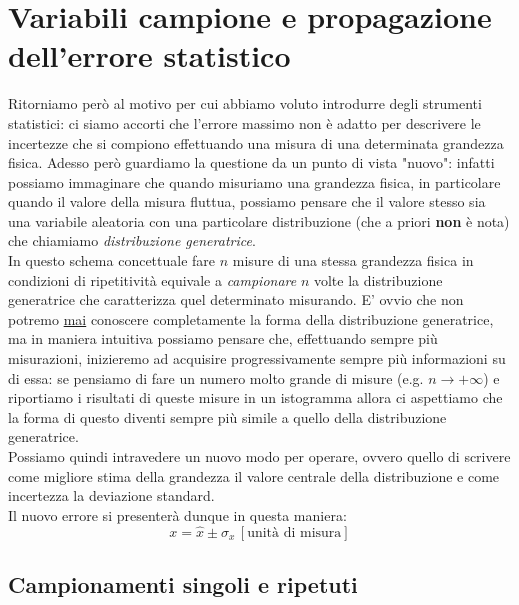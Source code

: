 \documentclass{report}
\begin{document}
\chapter{Variabili campione e propagazione dell'errore statistico}
Ritorniamo però al motivo per cui abbiamo voluto introdurre degli strumenti statistici: ci siamo accorti che l'errore massimo non è adatto per descrivere le incertezze che si compiono effettuando una misura di una determinata grandezza fisica. Adesso però guardiamo la questione da un punto di vista "nuovo": infatti possiamo immaginare che quando misuriamo una grandezza fisica, in particolare quando il valore della misura fluttua, possiamo pensare che il valore stesso sia una variabile aleatoria con una particolare distribuzione (che a priori \textbf{non} è nota) che chiamiamo \emph{distribuzione generatrice}. \\
In questo schema concettuale fare $n$ misure di una stessa grandezza fisica in condizioni di ripetitività equivale a \emph{campionare} $n$ volte la distribuzione generatrice che caratterizza quel determinato misurando. E' ovvio che non potremo \underline{mai} conoscere completamente la forma della distribuzione generatrice, ma in maniera intuitiva possiamo pensare che, effettuando sempre più misurazioni, inizieremo ad acquisire progressivamente sempre più informazioni su di essa: se pensiamo di fare un numero molto grande di misure (e.g. $n \to +\infty$) e riportiamo i risultati di queste misure in un istogramma allora ci aspettiamo che la forma di questo diventi sempre più simile a quello della distribuzione generatrice.   \\
Possiamo quindi intravedere un nuovo modo per operare, ovvero quello di scrivere come migliore stima della grandezza il valore centrale della distribuzione e come incertezza la deviazione standard. \\
Il nuovo errore si presenterà dunque in questa maniera:
\begin{equation} \label{misura}
	x = \hat{x} \pm \sigma_x \, [ \text{unità di misura} ]
\end{equation}
\section{Campionamenti singoli e ripetuti}
\end{document}
